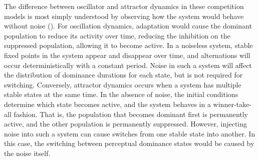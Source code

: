\documentclass{frontiersSCNS} %
\begin{document}
The difference between oscillator and attractor dynamics in these competition models is most simply understood by observing how the system would behave without noise (\cite{Shpiro2009, Moreno-Bote2007}). For oscillation dynamics, adaptation would cause the dominant population to reduce its activity over time, reducing the inhibition on the suppressed population, allowing it to become active. In a noiseless system, stable fixed points in the system appear and disappear over time, and alternations will occur deterministically with a constant period. Noise in such a system will affect the distribution of dominance durations for each state, but is not required for switching. Conversely, attractor dynamics occurs when a system has multiple stable states at the same time. In the absence of noise, the initial conditions determine which state becomes active, and the system behaves in a winner-take-all fashion. That is, the population that becomes dominant first is permanently active, and the other population is permanently suppressed. However, injecting noise into such a system can cause switches from one stable state into another. In this case, the switching between perceptual dominance states would be caused by the noise itself. 
\end{document}
